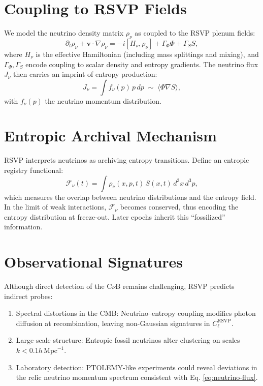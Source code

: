 \documentclass[12pt]{report}
\begin{document}
\section{Coupling to RSVP Fields}
We model the neutrino density matrix \(\rho_\nu\) as coupled to the RSVP plenum fields:
\begin{equation}
\partial_t \rho_\nu + \mathbf{v}\cdot\nabla \rho_\nu = -i[H_\nu, \rho_\nu] + \Gamma_\Phi \Phi + \Gamma_S S, \label{eq:neutrino-evolution}
\end{equation}
where \(H_\nu\) is the effective Hamiltonian (including mass splittings and mixing), and \(\Gamma_\Phi, \Gamma_S\) encode coupling to scalar density and entropy gradients. The neutrino flux \(J_\nu\) then carries an imprint of entropy production:
\begin{equation}
J_\nu = \int f_\nu(p)\, p \, dp \;\sim\; \langle \Phi \nabla S \rangle, \label{eq:neutrino-flux}
\end{equation}
with \(f_\nu(p)\) the neutrino momentum distribution.

\section{Entropic Archival Mechanism}
RSVP interprets neutrinos as archiving entropy transitions. Define an entropic registry functional:
\begin{equation}
\mathcal{F}_\nu(t) = \int \rho_\nu(x,p,t)\, S(x,t)\, d^3x\, d^3p, \label{eq:fossil-functional}
\end{equation}
which measures the overlap between neutrino distributions and the entropy field. In the limit of weak interactions, \(\mathcal{F}_\nu\) becomes conserved, thus encoding the entropy distribution at freeze-out. Later epochs inherit this “fossilized” information.

\section{Observational Signatures}
Although direct detection of the C\(\nu\)B remains challenging, RSVP predicts indirect probes:
\begin{enumerate}
    \item Spectral distortions in the CMB: Neutrino–entropy coupling modifies photon diffusion at recombination, leaving non-Gaussian signatures in \(C_\ell^{\text{RSVP}}\).
    \item Large-scale structure: Entropic fossil neutrinos alter clustering on scales \(k < 0.1 h\,\mathrm{Mpc}^{-1}\).
    \item Laboratory detection: PTOLEMY-like experiments could reveal deviations in the relic neutrino momentum spectrum consistent with Eq. \eqref{eq:neutrino-flux}.
\end{enumerate}
\end{document}
